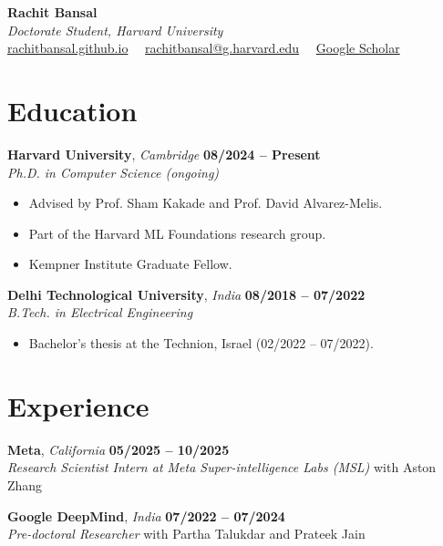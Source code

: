\documentclass[10pt,letterpaper]{article}
\begin{document}
\pagestyle{empty}

\begin{center}
    {\huge \bfseries Rachit Bansal} \\[3pt]
    {\large \itshape Doctorate Student, Harvard University} \\[4pt]
    \href{https://rachitbansal.github.io}{rachitbansal.github.io} \ \textperiodcentered \ \href{mailto:rachitbansal@g.harvard.edu}{rachitbansal@g.harvard.edu} \ \textperiodcentered \ \href{https://scholar.google.com}{Google Scholar}
\end{center}

\vspace{-4pt}

\section*{Education}
\textbf{Harvard University}, \textit{Cambridge} \hfill \textbf{08/2024 -- Present} \\
\textit{Ph.D. in Computer Science (ongoing)}
\begin{itemize}
    \item Advised by Prof. Sham Kakade and Prof. David Alvarez-Melis.
    \item Part of the Harvard ML Foundations research group.
    \item Kempner Institute Graduate Fellow.
\end{itemize}

\vspace{3pt}

\textbf{Delhi Technological University}, \textit{India} \hfill \textbf{08/2018 -- 07/2022} \\
\textit{B.Tech. in Electrical Engineering}
\begin{itemize}
    \item Bachelor's thesis at the Technion, Israel (02/2022 -- 07/2022).
\end{itemize}

\section*{Experience}
\textbf{Meta}, \textit{California} \hfill \textbf{05/2025 -- 10/2025} \\
\textit{Research Scientist Intern at Meta Super-intelligence Labs (MSL)} with Aston Zhang

\vspace{3pt}

\textbf{Google DeepMind}, \textit{India} \hfill \textbf{07/2022 -- 07/2024} \\
\textit{Pre-doctoral Researcher} with Partha Talukdar and Prateek Jain
\end{document}

